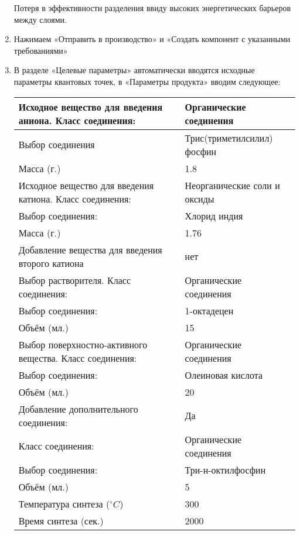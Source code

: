 \begin{enumerate}
    Потеря в эффективности разделения ввиду высоких энергетических барьеров между слоями.
    \item Нажимаем «Отправить в производство» и «Создать компонент с указанными требованиями»
    \item В разделе «Целевые параметры» автоматически вводятся исходные параметры квантовых точек, в «Параметры продукта» вводим следующее:
    
    \begin{table}[H]
        \begin{center}
            \begin{tabular}{|p{9cm}|p{5cm}|}
                \hline
                Исходное вещество для введения аниона. Класс соединения:&	Органические соединения \\
                \hline
                Выбор соединения	&Трис(триметилсилил) фосфин \\
                \hline
                Масса (г.)&	1.8 \\
                \hline
                Исходное вещество для введения катиона. Класс соединения:&	Неорганические соли и оксиды \\
                \hline
                Выбор соединения:&	Хлорид индия \\
                \hline
                Масса (г.)	&1.76 \\
                \hline
                Добавление вещества для введения второго катиона	&нет \\
                \hline
                Выбор растворителя. Класс соединения:	&Органические соединения \\
                \hline
                Выбор соединения:&	1-октадецен \\
                \hline
                Объём (мл.)	&15 \\
                \hline
                Выбор поверхностно-активного вещества. Класс соединения:	&Органические соединения \\
                \hline
                Выбор соединения:	&Олеиновая кислота \\
                \hline
                Объём (мл.)	&20 \\
                \hline
                Добавление дополнительного соединения:	&Да \\
                \hline
                Класс соединения:	&Органические соединения \\
                \hline
                Выбор соединения: &Три-н-октилфосфин \\
                \hline
                Объём (мл.)	&5 \\
                \hline
                Температура синтеза ($^\circ C$)&	300 \\
                \hline
                Время синтеза (сек.)	&2000 \\
                \hline
            \end{tabular}
        \end{center}
    \end{table}
    

\end{enumerate}

